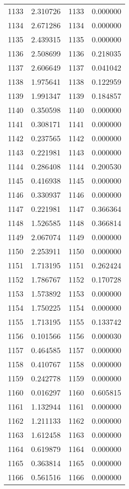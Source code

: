 \documentclass[12pt]{article}
\begin{document}
\begin{longtable}{@{}cccc@{}}
1133 & 2.310726 & 1133 & 0.000000 \\
1134 & 2.671286 & 1134 & 0.000000 \\
1135 & 2.439315 & 1135 & 0.000000 \\
1136 & 2.508699 & 1136 & 0.218035 \\
1137 & 2.606649 & 1137 & 0.041042 \\
1138 & 1.975641 & 1138 & 0.122959 \\
1139 & 1.991347 & 1139 & 0.184857 \\
1140 & 0.350598 & 1140 & 0.000000 \\
1141 & 0.308171 & 1141 & 0.000000 \\
1142 & 0.237565 & 1142 & 0.000000 \\
1143 & 0.221981 & 1143 & 0.000000 \\
1144 & 0.286408 & 1144 & 0.200530 \\
1145 & 0.416938 & 1145 & 0.000000 \\
1146 & 0.330937 & 1146 & 0.000000 \\
1147 & 0.221981 & 1147 & 0.366364 \\
1148 & 1.526585 & 1148 & 0.366814 \\
1149 & 2.067074 & 1149 & 0.000000 \\
1150 & 2.253911 & 1150 & 0.000000 \\
1151 & 1.713195 & 1151 & 0.262424 \\
1152 & 1.786767 & 1152 & 0.170728 \\
1153 & 1.573892 & 1153 & 0.000000 \\
1154 & 1.750225 & 1154 & 0.000000 \\
1155 & 1.713195 & 1155 & 0.133742 \\
1156 & 0.101566 & 1156 & 0.000030 \\
1157 & 0.464585 & 1157 & 0.000000 \\
1158 & 0.410767 & 1158 & 0.000000 \\
1159 & 0.242778 & 1159 & 0.000000 \\
1160 & 0.016297 & 1160 & 0.605815 \\
1161 & 1.132944 & 1161 & 0.000000 \\
1162 & 1.211133 & 1162 & 0.000000 \\
1163 & 1.612458 & 1163 & 0.000000 \\
1164 & 0.619879 & 1164 & 0.000000 \\
1165 & 0.363814 & 1165 & 0.000000 \\
1166 & 0.561516 & 1166 & 0.000000 \\

\end{longtable}
\end{document}
